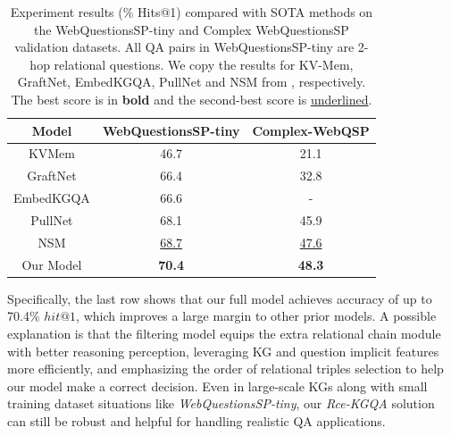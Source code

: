 \documentclass[pdflatex,sn-mathphys]{sn-jnl}%
\theoremstyle{thmstyleone}%
\theoremstyle{thmstyletwo}%
\theoremstyle{thmstylethree}%
\begin{document}
\begin{table}[h]
    \centering
    \begin{tabular}{c|c|c} \hline
    Model & WebQuestionsSP-tiny & \textcolor[rgb]{1,0,0}{Complex-WebQSP}\\ \hline %
    KVMem & 46.7 & 21.1 \\ \hline
    GraftNet & 66.4 & 32.8 \\ \hline
    EmbedKGQA & 66.6 & - \\ \hline
    PullNet & 68.1 & 45.9 \\ \hline
    \textcolor[rgb]{1,0,0}{NSM} & \underline{68.7} & \underline{47.6} \\ \hline
    Our Model & \bf{70.4} & \bf{48.3} \\ \hline
    \end{tabular}
    \caption{Experiment results (\% Hits@1) compared with SOTA methods on the WebQuestionsSP-tiny and Complex WebQuestionsSP validation datasets. All QA pairs in WebQuestionsSP-tiny are 2-hop relational questions. We copy the results for KV-Mem, GraftNet, EmbedKGQA, PullNet and NSM from \cite{kvmem,sun2018graftnet,apoorv2020embedKGQA,pullnet,he2021stu-teaQA}, respectively. The best score is in \textbf{bold} and the second-best score is \underline{underlined}.}
    \label{comparison_sota_wbq}
\end{table}


Specifically, the last row shows that our full model achieves accuracy of up to 70.4\% $hit@1$, which improves a large margin to other prior models. A possible explanation is that the filtering model equips the extra relational chain module with better reasoning perception, leveraging KG and question implicit features more efficiently, and emphasizing the order of relational triples selection to help our model make a correct decision. Even in large-scale KGs along with small training dataset situations like \textit{WebQuestionsSP-tiny}, our \textit{Rce-KGQA} solution can still be robust and helpful for handling realistic QA applications.
\end{document}
